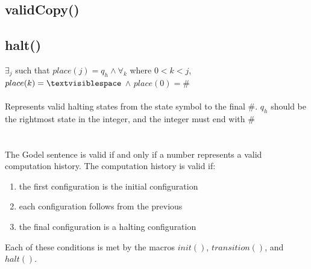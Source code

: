 \documentclass[letterpaper,notitlepage,twoside]{article}
\begin{document}
\subsection*{validCopy()}


\subsection*{halt()}
$\exists_j$ such that $place(j) = q_h \wedge \forall_k$ where $0 < k < j$, $place(k) = \textvisiblespace$ $\wedge$ $place(0) = \#$
\\\\
Represents valid halting states from the state symbol to the final $\#$. $q_h$ should be the rightmost state in the integer, and the integer must end with $\#$
\\\\\\
The Godel sentence is valid if and only if a number represents a valid computation history. The computation history is valid if:
\begin{enumerate}
\item the first configuration is the initial configuration
\item each configuration follows from the previous
\item the final configuration is a halting configuration
\end{enumerate}
Each of these conditions is met by the macros $init()$, $transition()$, and $halt()$.
\end{document}
